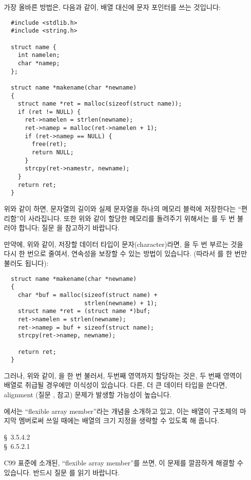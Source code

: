 \begin{faq}
        가장 올바른 방법은, 다음과 같이, 배열 대신에 문자 포인터를 쓰는
        것입니다:
\begin{verbatim}
  #include <stdlib.h>
  #include <string.h>

  struct name {
    int namelen;
    char *namep;
  };

  struct name *makename(char *newname)
  {
    struct name *ret = malloc(sizeof(struct name));
    if (ret != NULL) {
      ret->namelen = strlen(newname);
      ret->namep = malloc(ret->namelen + 1);
      if (ret->namep == NULL) {
        free(ret);
        return NULL;
      }
      strcpy(ret->namestr, newname);
    }
    return ret;
  }
\end{verbatim}
        위와 같이 하면, 문자열의 길이와 실제 문자열을 하나의 메모리 
        블럭에 저장한다는 ``편리함''이 사라집니다. 또한 위와 같이 할당한
        메모리를 돌려주기 위해서는
        를 두 번 불러야 합니다; 질문 을 참고하기 바랍니다.

        만약에, 위와 같이, 저장할 데이터 타입이 문자(character)라면,
        을 두 번 부르는 것을 다시 한 번으로 줄여서, 연속성을
        보장할 수 있는 방법이 있습니다.
        (따라서 를 한 번만 불러도 됩니다):
\begin{verbatim}
  struct name *makename(char *newname)
  {
    char *buf = malloc(sizeof(struct name) +
                       strlen(newname) + 1);
    struct name *ret = (struct name *)buf;
    ret->namelen = strlen(newname);
    ret->namep = buf + sizeof(struct name);
    strcpy(ret->namep, newname);

    return ret;
  }
\end{verbatim}
        그러나, 위와 같이, 을 한 번 불러서, 두번째 영역까지
        할당하는 것은, 두 번째 영역이  배열로 취급될 경우에만 
        이식성이 있습니다. 다른, 더 큰 데이터 타입을 쓴다면, alignment 
        (질문 ,  참고) 문제가
        발생할 가능성이 높습니다.

	\cite{c9x}에서는 ``flexible array member''라는 개념을 소개하고 있고, 
	이는 배열이 구조체의 마지막 멤버로써 쓰일 때에는 배열의 크기 지정을
	생략할 수 있도록 해 줍니다.

\R
	\cite{rationale} \S\ 3.5.4.2 \\
	\cite{c9x} \S\ 6.5.2.1

\T
	C99 표준에 소개된, ``flexible array member''를 쓰면, 이 문제를
        깔끔하게 해결할 수 있습니다. 반드시
        질문 를 읽기 바랍니다.
\end{faq}

